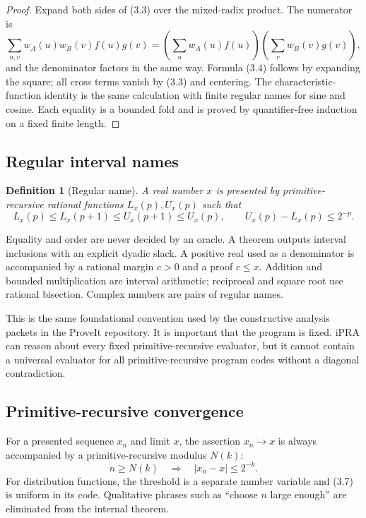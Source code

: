 \documentclass[11pt]{article}
\newtheorem{definition}[theorem]{Definition}
\newcommand{\ipra}{\mathrm{iPRA}}
\begin{document}
\begin{proof}
Expand both sides of (3.3) over the mixed-radix product.  The numerator is
\[
 \sum_{u,v}w_A(u)w_B(v)f(u)g(v)
 =\left(\sum_uw_A(u)f(u)\right)
  \left(\sum_vw_B(v)g(v)\right),                      \tag{3.5}
\]
and the denominator factors in the same way.  Formula (3.4) follows by
expanding the square; all cross terms vanish by (3.3) and centering.  The
characteristic-function identity is the same calculation with finite
regular names for sine and cosine.  Each equality is a bounded fold and is
proved by quantifier-free induction on a fixed finite length.
\end{proof}

\subsection{Regular interval names}

\begin{definition}[Regular name]
A real number \(x\) is presented by primitive-recursive rational functions
\(L_x(p),U_x(p)\) such that
\[
 L_x(p)\le L_x(p+1)\le U_x(p+1)\le U_x(p),
 \qquad U_x(p)-L_x(p)\le2^{-p}.                        \tag{3.6}
\]
\end{definition}

Equality and order are never decided by an oracle.  A theorem outputs
interval inclusions with an explicit dyadic slack.  A positive real used as
a denominator is accompanied by a rational margin \(c>0\) and a proof
\(c\le x\).  Addition and bounded multiplication are interval arithmetic;
reciprocal and square root use rational bisection.  Complex numbers are pairs
of regular names.

This is the same foundational convention used by the constructive analysis
packets in the ProveIt repository.  It is important that the program is
fixed.  \(\ipra\) can reason about every fixed primitive-recursive evaluator,
but it cannot contain a universal evaluator for all primitive-recursive
program codes without a diagonal contradiction.

\subsection{Primitive-recursive convergence}

For a presented sequence \(x_n\) and limit \(x\), the assertion
\(x_n\to x\) is always accompanied by a primitive-recursive modulus
\(N(k)\):
\[
 n\ge N(k)\quad\Longrightarrow\quad |x_n-x|\le2^{-k}. \tag{3.7}
\]
For distribution functions, the threshold is a separate number variable and
(3.7) is uniform in its code.  Qualitative phrases such as ``choose \(n\)
large enough'' are eliminated from the internal theorem.
\end{document}
